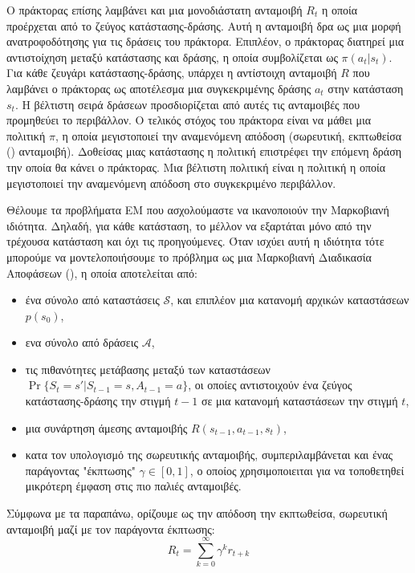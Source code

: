 Ο πράκτορας επίσης λαμβάνει και μια μονοδιάστατη ανταμοιβή $R_t$ η οποία προέρχεται από το ζεύγος κατάστασης-δράσης. Αυτή η
ανταμοιβή δρα ως μια μορφή ανατροφοδότησης για τις δράσεις του πράκτορα. Επιπλέον, ο πράκτορας διατηρεί μια αντιστοίχηση μεταξύ
κατάστασης και δράσης, η οποία συμβολίζεται ως $π(a_t | s_t)$. Για κάθε ζευγάρι κατάστασης-δράσης, υπάρχει η αντίστοιχη ανταμοιβή $R$
που λαμβάνει ο πράκτορας ως αποτέλεσμα μια συγκεκριμένης δράσης $a_t$ στην κατάσταση $s_t$. Η βέλτιστη σειρά δράσεων προσδιορίζεται
από αυτές τις ανταμοιβές που προμηθεύει το περιβάλλον. Ο τελικός στόχος του πράκτορα είναι να μάθει μια πολιτική $π$, η οποία μεγιστοποιεί
την αναμενόμενη απόδοση (σωρευτική, εκπτωθείσα () ανταμοιβή). Δοθείσας μιας κατάστασης η πολιτική επιστρέφει την επόμενη δράση την οποία θα κάνει ο πράκτορας.
Μια βέλτιστη πολιτική είναι η πολιτική η οποία μεγιστοποιεί την αναμενόμενη απόδοση στο συγκεκριμένο περιβάλλον.

Θέλουμε τα προβλήματα ΕΜ που ασχολούμαστε να ικανοποιούν την Μαρκοβιανή ιδιότητα. Δηλαδή, για κάθε κατάσταση, το μέλλον να εξαρτάται μόνο από
την τρέχουσα κατάσταση και όχι τις προηγούμενες. Όταν ισχύει αυτή η ιδιότητα τότε μπορούμε να μοντελοποιήσουμε το πρόβλημα ως μια Μαρκοβιανή
Διαδικασία Αποφάσεων (), η οποία αποτελείται από:
\begin{itemize}
    \item ένα σύνολο από καταστάσεις $\mathcal{S}$, και επιπλέον μια κατανομή αρχικών καταστάσεων $p(s_0)$,
    \item ενα σύνολο από δράσεις $\mathcal{A}$,
    \item τις πιθανότητες μετάβασης μεταξύ των καταστάσεων \\ $\Pr{\{S_t=s'|S_{t-1}=s, A_{t-1}=a\}}$, οι οποίες αντιστοιχούν ένα ζεύγος
          κατάστασης-δράσης την στιγμή $t-1$ σε μια κατανομή καταστάσεων την στιγμή $t$,
    \item μια συνάρτηση άμεσης ανταμοιβής $R(s_{t-1}, a_{t-1}, s_t)$,
    \item κατα τον υπολογισμό της σωρευτικής ανταμοιβής, συμπεριλαμβάνεται και ένας παράγοντας "έκπτωσης" $\gamma \in [0,1]$, ο οποίος
          χρησιμοποιειται για να τοποθετηθεί μικρότερη έμφαση στις πιο παλιές ανταμοιβές.
\end{itemize}

Σύμφωνα με τα παραπάνω, ορίζουμε ως την απόδοση την εκπτωθείσα, σωρευτική ανταμοιβή μαζί με τον παράγοντα έκπτωσης:
\begin{equation}
    R_t = \sum_{k=0}^{\infty}{\gamma^k r_{t+k}}
\end{equation}

